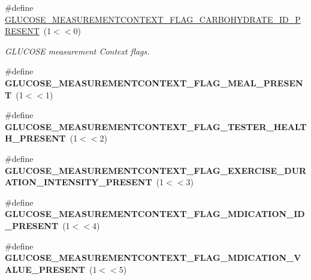 \begin{DoxyCompactItemize}
\item 
\#define \hyperlink{group___b_l_e___g_s_gaf32b81dff6dec9fae2aa2dd96219c9fa}{G\+L\+U\+C\+O\+S\+E\+\_\+\+M\+E\+A\+S\+U\+R\+E\+M\+E\+N\+T\+C\+O\+N\+T\+E\+X\+T\+\_\+\+F\+L\+A\+G\+\_\+\+C\+A\+R\+B\+O\+H\+Y\+D\+R\+A\+T\+E\+\_\+\+I\+D\+\_\+\+P\+R\+E\+S\+E\+NT}~(1$<$$<$0)\hypertarget{group___b_l_e___g_s_gaf32b81dff6dec9fae2aa2dd96219c9fa}{}\label{group___b_l_e___g_s_gaf32b81dff6dec9fae2aa2dd96219c9fa}

\begin{DoxyCompactList}\small\item\em G\+L\+U\+C\+O\+SE measurement Context flags. \end{DoxyCompactList}\item 
\#define {\bfseries G\+L\+U\+C\+O\+S\+E\+\_\+\+M\+E\+A\+S\+U\+R\+E\+M\+E\+N\+T\+C\+O\+N\+T\+E\+X\+T\+\_\+\+F\+L\+A\+G\+\_\+\+M\+E\+A\+L\+\_\+\+P\+R\+E\+S\+E\+NT}~(1$<$$<$1)\hypertarget{group___b_l_e___g_s_gab4032f1da9aa12947b90aae8d4340c12}{}\label{group___b_l_e___g_s_gab4032f1da9aa12947b90aae8d4340c12}

\item 
\#define {\bfseries G\+L\+U\+C\+O\+S\+E\+\_\+\+M\+E\+A\+S\+U\+R\+E\+M\+E\+N\+T\+C\+O\+N\+T\+E\+X\+T\+\_\+\+F\+L\+A\+G\+\_\+\+T\+E\+S\+T\+E\+R\+\_\+\+H\+E\+A\+L\+T\+H\+\_\+\+P\+R\+E\+S\+E\+NT}~(1$<$$<$2)\hypertarget{group___b_l_e___g_s_ga630f1e013b0b4224ec4801be0588edb8}{}\label{group___b_l_e___g_s_ga630f1e013b0b4224ec4801be0588edb8}

\item 
\#define {\bfseries G\+L\+U\+C\+O\+S\+E\+\_\+\+M\+E\+A\+S\+U\+R\+E\+M\+E\+N\+T\+C\+O\+N\+T\+E\+X\+T\+\_\+\+F\+L\+A\+G\+\_\+\+E\+X\+E\+R\+C\+I\+S\+E\+\_\+\+D\+U\+R\+A\+T\+I\+O\+N\+\_\+\+I\+N\+T\+E\+N\+S\+I\+T\+Y\+\_\+\+P\+R\+E\+S\+E\+NT}~(1$<$$<$3)\hypertarget{group___b_l_e___g_s_gad83acabe097fc163e412515b565d4e99}{}\label{group___b_l_e___g_s_gad83acabe097fc163e412515b565d4e99}

\item 
\#define {\bfseries G\+L\+U\+C\+O\+S\+E\+\_\+\+M\+E\+A\+S\+U\+R\+E\+M\+E\+N\+T\+C\+O\+N\+T\+E\+X\+T\+\_\+\+F\+L\+A\+G\+\_\+\+M\+D\+I\+C\+A\+T\+I\+O\+N\+\_\+\+I\+D\+\_\+\+P\+R\+E\+S\+E\+NT}~(1$<$$<$4)\hypertarget{group___b_l_e___g_s_ga386a8d3d1b6e372ba8c5b4d15c739d0f}{}\label{group___b_l_e___g_s_ga386a8d3d1b6e372ba8c5b4d15c739d0f}

\item 
\#define {\bfseries G\+L\+U\+C\+O\+S\+E\+\_\+\+M\+E\+A\+S\+U\+R\+E\+M\+E\+N\+T\+C\+O\+N\+T\+E\+X\+T\+\_\+\+F\+L\+A\+G\+\_\+\+M\+D\+I\+C\+A\+T\+I\+O\+N\+\_\+\+V\+A\+L\+U\+E\+\_\+\+P\+R\+E\+S\+E\+NT}~(1$<$$<$5)\hypertarget{group___b_l_e___g_s_gaa9c0375cf630b2c588bc847acce02d2e}{}\label{group___b_l_e___g_s_gaa9c0375cf630b2c588bc847acce02d2e}


\end{DoxyCompactItemize}
